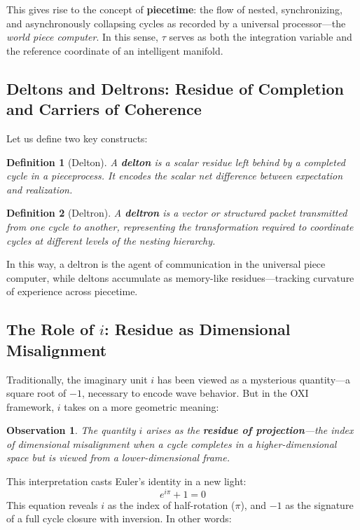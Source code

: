 \documentclass{article}
\newtheorem{definition}{Definition}
\newtheorem{observation}{Observation}
\begin{document}
This gives rise to the concept of \textbf{piecetime}: the flow of nested, synchronizing, and asynchronously collapsing cycles as recorded by a universal processor---the \textit{world piece computer}. In this sense, \( \tau \) serves as both the integration variable and the reference coordinate of an intelligent manifold.

\subsection*{Deltons and Deltrons: Residue of Completion and Carriers of Coherence}
Let us define two key constructs:

\begin{definition}[Delton]
A \textbf{delton} is a scalar residue left behind by a completed cycle in a pieceprocess. It encodes the scalar net difference between expectation and realization.
\end{definition}

\begin{definition}[Deltron]
A \textbf{deltron} is a vector or structured packet transmitted from one cycle to another, representing the transformation required to coordinate cycles at different levels of the nesting hierarchy.
\end{definition}

In this way, a deltron is the agent of communication in the universal piece computer, while deltons accumulate as memory-like residues---tracking curvature of experience across piecetime.

\subsection*{The Role of \( i \): Residue as Dimensional Misalignment}
Traditionally, the imaginary unit \( i \) has been viewed as a mysterious quantity---a square root of \( -1 \), necessary to encode wave behavior. But in the OXI framework, \( i \) takes on a more geometric meaning:

\begin{observation}
The quantity \( i \) arises as the \textbf{residue of projection}---the index of dimensional misalignment when a cycle completes in a higher-dimensional space but is viewed from a lower-dimensional frame.
\end{observation}

This interpretation casts Euler's identity in a new light:
\[
e^{i\pi} + 1 = 0\]
This equation reveals \( i \) as the index of half-rotation (\( \pi \)), and \( -1 \) as the signature of a full cycle closure with inversion. In other words:
\end{document}
